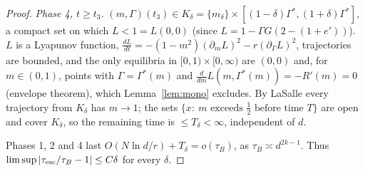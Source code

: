 \begin{proof}
\emph{Phase 4, $t\ge t_3$.} $(m,\Gamma)(t_3)\in K_\delta=\{m_\delta\}\times[(1-\delta)\Gamma^*,(1+\delta)\Gamma^*]$, a compact set on which $L<1=L(0,0)$
(since $L=1-\Gamma G(2-(1+e'))$). $L$ is a Lyapunov function, $\frac{dL}{dt}=-(1-m^2)(\partial_mL)^2-r(\partial_\Gamma L)^2$, trajectories are bounded, and the
only equilibria in $[0,1)\times[0,\infty)$ are $(0,0)$ and, for $m\in(0,1)$, points with $\Gamma=\Gamma^*(m)$ and $\frac{d}{dm}L(m,\Gamma^*(m))=-R'(m)=0$
(envelope theorem), which Lemma~\ref{lem:mono} excludes. By LaSalle every trajectory from $K_\delta$ has $m\to1$; the sets
$\{x:\ m\text{ exceeds }\frac12\text{ before time }T\}$ are open and cover $K_\delta$, so the remaining time is $\le T_\delta<\infty$, independent of $d$.

Phases 1, 2 and 4 last $O(N\ln d/r)+T_\delta=o(\tau_B)$, as $\tau_B\asymp d^{2k-1}$. Thus $\limsup|\tau_{\rm esc}/\tau_B-1|\le C\delta$ for every $\delta$.
\end{proof}

